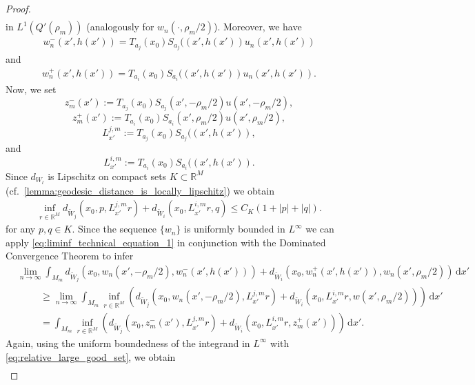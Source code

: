 \documentclass[a4paper, 11pt, reqno]{amsart}
\theoremstyle{plain}
\theoremstyle{definition}
\theoremstyle{remark}
\newcommand{\R}{\mathbb R}
\begin{document}
\begin{proof}
\begin{align*}
    \end{align*}
    in $L^1(Q'(\rho_m))$ (analogously for $w_n(\cdot , \rho_m/2)$). Moreover, we have 
    \begin{align*}
        w_n^-(x', h(x')) = T_{a_j}(x_0)S_{a_j}((x', h(x')) u_n(x', h(x'))
    \end{align*}
    and 
    \begin{align*}
        w_n^+(x', h(x')) = T_{a_i}(x_0)S_{a_i}((x', h(x')) u_n(x', h(x')).
    \end{align*}
    Now, we set 
    \[
        z^-_m(x') := T_{a_j}(x_0)S_{a_j}(x' , -\rho_m/2)u(x', -\rho_m/2),
    \]
    \[
        z^+_m(x') := T_{a_i}(x_0)S_{a_i}(x' , \rho_m/2)u(x', \rho_m/2),
    \]
    \[
        L^{j,m}_{x'} := T_{a_j}(x_0)S_{a_j}((x', h(x')),
    \]
    and 
    \[
        L^{i,m}_{x'} := T_{a_i}(x_0)S_{a_i}((x', h(x')).
    \]
    Since  $d_{W_l}$ is Lipschitz on compact sets $K \subset \R^M$ (cf.\ \ref{lemma:geodesic_distance_is_locally_lipschitz}) we obtain
    \begin{align}\label{eq:liminf_technical_equation_1}
        \inf_{r \in \R^M} d_{\widetilde W_j}(x_0, p, L^{j,m}_{x'}r) + d_{\widetilde W_i}(x_0, L^{i,m}_{x'}r, q) \leq C_K(1 + |p| + |q|). 
    \end{align}
    for any $p, q \in K$. Since the sequence $\{w_n\}$ is uniformly bounded in $L^\infty$ we can apply \eqref{eq:liminf_technical_equation_1} in conjunction with the Dominated Convergence Theorem to infer 
    \begin{align}\label{eq:liminf_partial_inequality_7}
        &\lim_{n \to \infty}\int_{M_m} d_{\widetilde W_j}(x_0, w_n(x', -\rho_m/2), w_n^-(x', h(x'))) + d_{\widetilde W_i}(x_0, w_n^+(x', h(x')), w_n(x', \rho_m/2)) \, \mathrm{d}x' \nonumber \\
        & \hspace{1cm }\geq \lim_{n \to \infty} \int_{M_m} \inf_{r \in \R^M} \left( d_{\widetilde W_j}(x_0, w_n(x', -\rho_m/2), L^{j,m}_{x'}r) + d_{\widetilde W_i}(x_0, L^{i,m}_{x'}r, w(x', \rho_m/2)) \right) \, \mathrm{d}x' \nonumber \\
        & \hspace{1cm} = \int_{M_m} \inf_{r \in \R^M} \left( d_{\widetilde W_j}(x_0, z_m^-(x'), L^{j,m}_{x'}r) + d_{\widetilde W_i}(x_0, L^{i,m}_{x'}r, z_m^+(x')) \right) \, \mathrm{d}x'.
    \end{align}
    Again, using the uniform boundedness of the integrand in $L^\infty$ with \eqref{eq:relative_large_good_set}, we obtain
    \begin{align}\label{eq:liminf_partial_inequality_8}

\end{align}
\end{proof}
\end{document}
